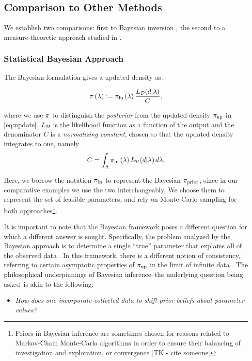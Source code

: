 
\subsection{Comparison to Other Methods}\label{sec:othermethods}
We establish two comparisons: first to Bayesian inversion \cite{Walpole, Berger, Complete, Smith}, the second to a measure-theoretic approach studied in \cite{BET+14, BE13}. 


\subsubsection{Statistical Bayesian Approach}


The Bayesian formulation gives a updated density as:

\begin{equation}\label{eq:sb_post}
    \pi\left ( \lambda \right ) := \operatorname*{\pi_{in}}\left ( \lambda \right ) \frac{L_{\mathcal{D}} (d | \lambda)}{ C },
\end{equation}

where we use $\pi$ to distinguish the \emph{posterior} from the updated density $\operatorname*{\pi_{up}}$ in \eqref{eq:update}.
$L_{\mathcal{D}}$ is the likelihood function as a function of the output and the denominator $C$ is a \emph{normalizing constant}, chosen so that the updated density integrates to one, namely
\[
C = \int_{\Lambda} \operatorname*{\pi_{in}}\left ( \lambda \right ) L_{\mathcal{D}}(d | \lambda) \, d\lambda.
\]

Here, we borrow the notation $\operatorname*{\pi_{in}}$ to represent the Bayesian $\pi_\text{prior}$, since in our comparative examples we use the two interchangeably.
We choose them to represent the set of feasible parameters, and rely on Monte-Carlo sampling for both approaches\footnote{Priors in Bayesian inference are sometimes chosen for reasons related to Markov-Chain Monte-Carlo algorithms in order to ensure their balancing of investigation and exploration, or convergence [TK - cite someone]}.

It is important to note that the Bayesian framework poses a different question for which a different answer is sought.
Specifically, the problem analyzed by the Bayesian approach is to determine a single ``true'' parameter that explains all of the observed data \cite{Smith, Concrete, Complete}.
In this framework, there is a different notion of consistency, referring to certain asymptotic properties of $\operatorname*{\pi_{up}}$ in the limit of infinite data \cite{Barron, Silverman}.
The philosophical underpinnings of Bayesian inference\---the underlying question being asked\---is akin to the following:
\begin{itemize}
  \item \emph{How does one incorporate collected data to shift prior beliefs about parameter values?}
\end{itemize}

